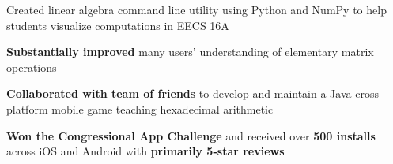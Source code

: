 \documentclass[]{deedy-resume-openfont}
\begin{document}
\begin{minipage}[t]{0.66\textwidth}
\begin{tightemize}
\item Created linear algebra command line utility using Python and NumPy to help students visualize computations in EECS 16A
\item \textbf{Substantially improved} many users' understanding of elementary matrix operations
\end{tightemize}
\sectionsep

\begin{tightemize}
\item \textbf{Collaborated with team of friends} to develop and maintain a Java cross-platform mobile game teaching hexadecimal arithmetic
\item \textbf{Won the Congressional App Challenge} and received over \textbf{500 installs} across iOS and Android with \textbf{primarily 5-star reviews}
\end{tightemize}
\sectionsep

\end{minipage} 
\end{document}
